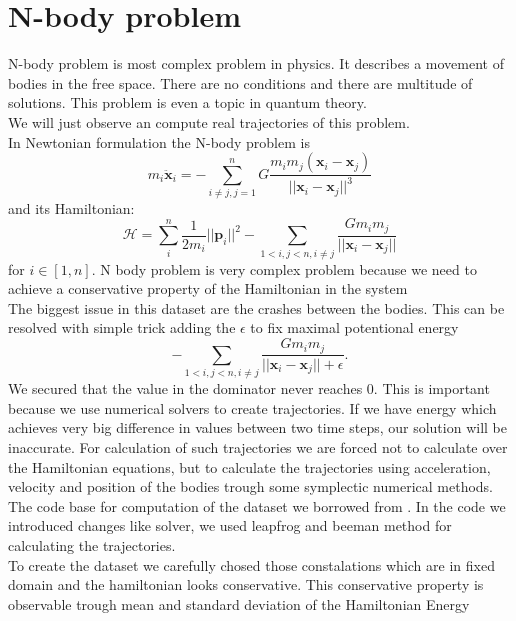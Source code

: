 \section{N-body problem}
N-body problem is most complex problem in physics. It describes a movement of bodies in the free space. There are no conditions and there are multitude of solutions. This problem is even a topic in quantum theory.\\ We will just observe an compute real trajectories of this problem.\\ 
In Newtonian formulation the N-body problem is
\begin{equation}
m_i\ddot{\mathbf{x}}_i = -\sum_{i\neq j, j=1}^nG\frac{m_im_j(\mathbf{x}_i-\mathbf{x}_j)}{||\mathbf{x}_i-\mathbf{x}_j||^3}
\end{equation} 
and its Hamiltonian:
\begin{equation}
	\mathcal{H} =\sum_i^n \frac{1}{2m_i}||\mathbf{p}_i||^2 - \sum_{1<i,j<n,i\neq j}\frac{Gm_im_j}{||\mathbf{x}_i-\mathbf{x}_j||}
\end{equation} 
for $i \in[1,n].$
N body problem is very complex problem because we need to achieve a conservative property of the Hamiltonian in the system\\
The biggest issue in this dataset are the crashes between the bodies.
This can be resolved with simple trick adding the $\epsilon$ to fix maximal potentional energy
\begin{equation}
	- \sum_{1<i,j<n,i\neq j}\frac{Gm_im_j}{||\mathbf{x}_i-\mathbf{x}_j||+\epsilon}.
\end{equation}
We secured that the value in the dominator never reaches 0. This is important because we use numerical solvers to create trajectories. If we have energy which achieves very big difference in values between two time steps, our solution will be inaccurate.  For calculation of such trajectories we are forced not to calculate over the Hamiltonian equations, but to calculate the trajectories using acceleration, velocity and position of the bodies trough some symplectic numerical methods. The code base for computation of the dataset we borrowed from \cite{nb}. In the code we introduced changes like solver, we used leapfrog and beeman method for calculating the trajectories.\\
To create the dataset we carefully chosed those constalations which are in fixed domain and the hamiltonian looks conservative. This conservative property is observable trough mean and standard deviation of the Hamiltonian Energy 
